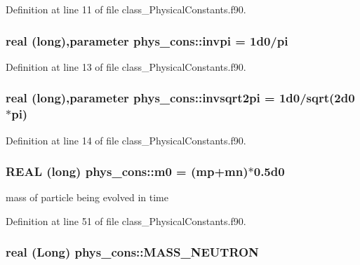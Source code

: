 Definition at line 11 of file class\_\-PhysicalConstants.f90.

\hypertarget{namespacephys__cons_aa8683f00f4216acc1822dfcb85b1ee00}{
\subsubsection[{invpi}]{\setlength{\rightskip}{0pt plus 5cm}real (long),parameter {\bf phys\_\-cons::invpi} = 1d0/pi}}
\label{namespacephys__cons_aa8683f00f4216acc1822dfcb85b1ee00}


Definition at line 13 of file class\_\-PhysicalConstants.f90.

\hypertarget{namespacephys__cons_a369d33713444a99a71f80a74c0652d4e}{
\subsubsection[{invsqrt2pi}]{\setlength{\rightskip}{0pt plus 5cm}real (long),parameter {\bf phys\_\-cons::invsqrt2pi} = 1d0/sqrt(2d0$\ast$pi)}}
\label{namespacephys__cons_a369d33713444a99a71f80a74c0652d4e}


Definition at line 14 of file class\_\-PhysicalConstants.f90.

\hypertarget{namespacephys__cons_afa35c20a6e2a70b58142d10071eeef10}{
\subsubsection[{m0}]{\setlength{\rightskip}{0pt plus 5cm}REAL (long) {\bf phys\_\-cons::m0} = ({\bf mp}+{\bf mn})$\ast$0.5d0}}
\label{namespacephys__cons_afa35c20a6e2a70b58142d10071eeef10}


mass of particle being evolved in time 



Definition at line 51 of file class\_\-PhysicalConstants.f90.

\hypertarget{namespacephys__cons_abeff422917cc48601644e90ab12fb7c0}{
\subsubsection[{MASS\_\-NEUTRON}]{\setlength{\rightskip}{0pt plus 5cm}real (Long) {\bf phys\_\-cons::MASS\_\-NEUTRON}}}
\label{namespacephys__cons_abeff422917cc48601644e90ab12fb7c0}


